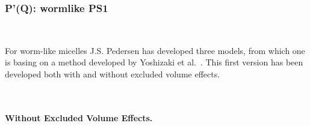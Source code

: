 \clearpage
\subsubsection{P'(Q): wormlike PS1} ~\\
\label{plugin:Pprime4wormPS1}

For worm-like micelles J.S. Pedersen \cite{Pedersen96Macrom} has developed three models, from which one is basing on a method developed by Yoshizaki et al.\ \cite{Yoshizaki1980}. This first version has been developed both with and without excluded volume effects.

~\\
\paragraph*{\textbf{Without Excluded Volume Effects.}}~\\


